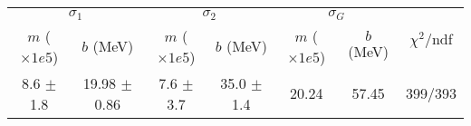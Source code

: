 \begin{tabular}{cc|cc|cc||c}
\multicolumn{2}{c|}{$\sigma_1$} & \multicolumn{2}{|c}{$\sigma_2$} & \multicolumn{2}{|c}{$\sigma_G$}  & \multirow{2}{*}{$\chi^2/$ndf}\\
$m$ ($\times1e5$) & $b$ (MeV) & $m$ ($\times1e5$) & $b$ (MeV) & $m$ ($\times1e5$) & $b$ (MeV) & \\
\hline
8.6 $\pm$ 1.8 & 19.98 $\pm$ 0.86 & 7.6 $\pm$ 3.7 & 35.0 $\pm$ 1.4 & 20.24 & 57.45 & 399/393\\
\end{tabular}
